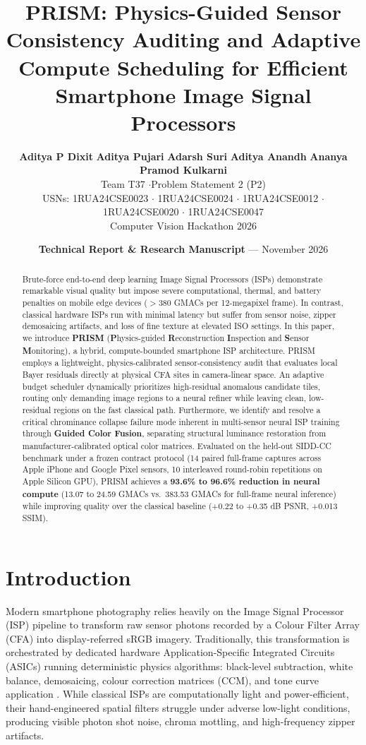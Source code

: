 \documentclass[10pt,twocolumn]{article}
\title{\textbf{\Large PRISM: Physics-Guided Sensor Consistency Auditing and Adaptive Compute Scheduling for Efficient Smartphone Image Signal Processors}}
\author{
  \textbf{Aditya P Dixit}\quad
  \textbf{Aditya Pujari}\quad
  \textbf{Adarsh Suri}\quad
  \textbf{Aditya Anandh}\quad
  \textbf{Ananya Pramod Kulkarni}\\
  \small Team T37 \quad$\cdot$\quad Problem Statement 2 (P2)\\
  \small USNs: 1RUA24CSE0023 $\cdot$ 1RUA24CSE0024 $\cdot$ 1RUA24CSE0012 $\cdot$ 1RUA24CSE0020 $\cdot$ 1RUA24CSE0047\\
  \small Computer Vision Hackathon 2026
}
\date{\textbf{Technical Report \& Research Manuscript} --- November 2026}
\begin{document}
\maketitle

\begin{abstract}
Brute-force end-to-end deep learning Image Signal Processors (ISPs) demonstrate remarkable visual quality but impose severe computational, thermal, and battery penalties on mobile edge devices ($>380$ GMACs per 12-megapixel frame). In contrast, classical hardware ISPs run with minimal latency but suffer from sensor noise, zipper demosaicing artifacts, and loss of fine texture at elevated ISO settings. In this paper, we introduce \textbf{PRISM} (\textbf{P}hysics-guided \textbf{R}econstruction \textbf{I}nspection and \textbf{S}ensor \textbf{M}onitoring), a hybrid, compute-bounded smartphone ISP architecture. PRISM employs a lightweight, physics-calibrated sensor-consistency audit that evaluates local Bayer residuals directly at physical CFA sites in camera-linear space. An adaptive budget scheduler dynamically prioritizes high-residual anomalous candidate tiles, routing only demanding image regions to a neural refiner while leaving clean, low-residual regions on the fast classical path. Furthermore, we identify and resolve a critical chrominance collapse failure mode inherent in multi-sensor neural ISP training through \textbf{Guided Color Fusion}, separating structural luminance restoration from manufacturer-calibrated optical color matrices. Evaluated on the held-out SIDD-CC benchmark under a frozen contract protocol (14 paired full-frame captures across Apple iPhone and Google Pixel sensors, 10 interleaved round-robin repetitions on Apple Silicon GPU), PRISM achieves a \textbf{93.6\% to 96.6\% reduction in neural compute} (13.07 to 24.59 GMACs vs.\ 383.53 GMACs for full-frame neural inference) while improving quality over the classical baseline (+0.22 to +0.35 dB PSNR, +0.013 SSIM).
\end{abstract}

\section{Introduction}

Modern smartphone photography relies heavily on the Image Signal Processor (ISP) pipeline to transform raw sensor photons recorded by a Colour Filter Array (CFA) into display-referred sRGB imagery. Traditionally, this transformation is orchestrated by dedicated hardware Application-Specific Integrated Circuits (ASICs) running deterministic physics algorithms: black-level subtraction, white balance, demosaicing, colour correction matrices (CCM), and tone curve application \cite{karaimer2016software}. While classical ISPs are computationally light and power-efficient, their hand-engineered spatial filters struggle under adverse low-light conditions, producing visible photon shot noise, chroma mottling, and high-frequency zipper artifacts.
\end{document}
